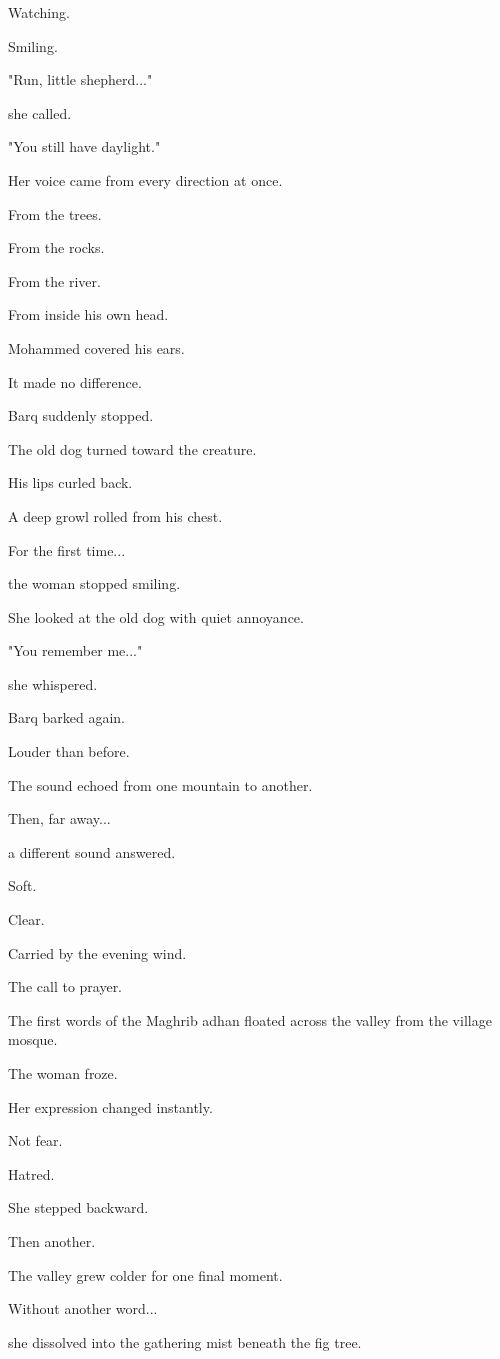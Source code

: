\documentclass[12pt,openany]{book}
\begin{document}
Watching.

Smiling.

"Run, little shepherd..."

she called.

"You still have daylight."

Her voice came from every direction at once.

From the trees.

From the rocks.

From the river.

From inside his own head.

Mohammed covered his ears.

It made no difference.

Barq suddenly stopped.

The old dog turned toward the creature.

His lips curled back.

A deep growl rolled from his chest.

For the first time...

the woman stopped smiling.

She looked at the old dog with quiet annoyance.

"You remember me..."

she whispered.

Barq barked again.

Louder than before.

The sound echoed from one mountain to another.

Then, far away...

a different sound answered.

Soft.

Clear.

Carried by the evening wind.

The call to prayer.

The first words of the Maghrib adhan floated across the valley from the village mosque.

The woman froze.

Her expression changed instantly.

Not fear.

Hatred.

She stepped backward.

Then another.

The valley grew colder for one final moment.

Without another word...

she dissolved into the gathering mist beneath the fig tree.
\end{document}
